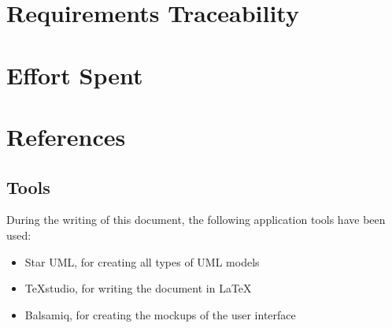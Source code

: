 \documentclass[11pt,a4paper]{report}
\begin{document}
\chapter{Requirements Traceability}
\chapter{Effort Spent}
\chapter{References}
\section{Tools}
During the writing of this document, the following application tools have been used:
\begin{itemize}
	\item Star UML, for creating all types of UML models
	\item TeXstudio, for writing the document in \LaTeX
	\item Balsamiq, for creating the mockups of the user interface
\end{itemize}
\end{document}
